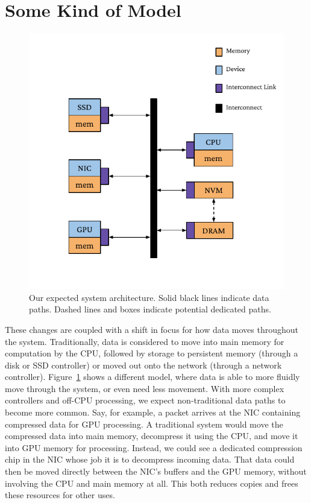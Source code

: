 \section{Some Kind of Model}
\begin{figure}
    \centering
    \includegraphics[width=\linewidth]{fig/gen_sys_diag}
    \caption[Expected hardware system architecture]{Our expected system architecture. Solid black lines indicate data paths. Dashed lines and boxes indicate potential dedicated paths.}
    \label{fig:sys_arch}
\end{figure}


These changes are coupled with a shift in focus for how data moves throughout the system.
Traditionally, data is considered to move into main memory for computation by the CPU, followed by
storage to persistent memory (through a disk or SSD controller) or moved out onto the network
(through a network controller). Figure~\ref{fig:sys_arch} shows a different model, where data is able to more
fluidly move
through the system, or even need less movement. With more complex controllers and off-CPU processing, we expect
non-traditional data paths to become more common. Say, for example, a packet arrives at the NIC
containing compressed data for GPU processing. A traditional system would move the compressed data
into main memory, decompress it using the CPU, and move it into GPU memory for processing. Instead,
we could see a dedicated compression chip in the NIC whose job it is to decompress incoming data.
That data could then be moved directly between the NIC's buffers and the GPU memory, without involving
the CPU and main memory at all. This both reduces copies and frees these
resources for other uses.

